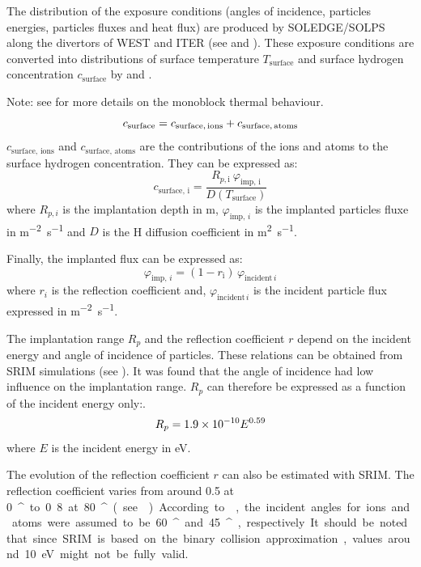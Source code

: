 The distribution of the exposure conditions (angles of incidence, particles energies, particles fluxes and heat flux) are produced by SOLEDGE/SOLPS along the divertors of WEST and ITER (see  and ).
These exposure conditions are converted into distributions of surface temperature $T_\mathrm{surface}$ and surface hydrogen concentration $c_\mathrm{surface}$ by  and .

Note: see  for more details on the monoblock thermal behaviour.
\begin{equation}
    c_\mathrm{surface} = c_\mathrm{surface, \, ions} + c_\mathrm{surface, \, atoms}
    \labeq{c_surface}
\end{equation}
$c_\mathrm{surface, \, ions}$ and $c_\mathrm{surface, \, atoms}$ are the contributions of the ions and atoms to the surface hydrogen concentration.
They can be expressed as:
\begin{equation}
    c_\mathrm{surface, \, i} = \frac{R_{p, \mathrm{i}} \ \varphi_\mathrm{imp, \,i}}{D(T_\mathrm{surface})}
\end{equation}
where $R_{p, i}$ is the implantation depth in \si{m}, $\varphi_{\mathrm{imp}, \,i}$ is the implanted particles fluxe in \si{m^{-2}.s^{-1}} and $D$ is the H diffusion coefficient in \si{m^{2}.s^{-1}}.

Finally, the implanted flux can be expressed as:
\begin{equation}
    \varphi_{\mathrm{imp}, \,i} = (1 - r_\mathrm{i}) \, \varphi_{\mathrm{incident} \, i}
\end{equation}
where $r_i$ is the reflection coefficient and, $\varphi_{\mathrm{incident} \, i}$ is the incident particle flux expressed in \si{m^{-2}.s^{-1}}.

The implantation range $R_p$ and the reflection coefficient $r$ depend on the incident energy and angle of incidence of particles.
These relations can be obtained from SRIM  simulations (see ).
It was found that the angle of incidence had low influence on the implantation range.
$R_p$ can therefore be expressed as a function of the incident energy only:.
\begin{equation}
    R_p = 1.9\times 10^{-10} E ^{0.59}
    \labeq{implantation range}
\end{equation}
where $E$ is the incident energy in \si{eV}.

The evolution of the reflection coefficient $r$ can also be estimated with SRIM.
The reflection coefficient varies from around 0.5 at \SI{0}{^\circ} to 0.8 at \SI{80}{^\circ} (see ).
According to , the incident angles for ions and atoms were assumed to be \SI{60}{^\circ} and \SI{45}{^\circ}, respectively.
It should be noted that since SRIM is based on the binary collision approximation, values around \SI{10}{eV} might not be fully valid.

